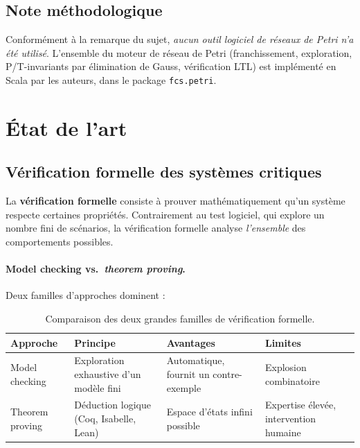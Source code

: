 \documentclass[11pt,a4paper]{article}
\newcommand{\code}[1]{\texttt{#1}}
\begin{document}
\subsection{Note méthodologique}

Conformément à la remarque du sujet, \emph{aucun outil logiciel de réseaux de
Petri n'a été utilisé}. L'ensemble du moteur de réseau de Petri (franchissement,
exploration, P/T-invariants par élimination de Gauss, vérification LTL) est
implémenté en Scala par les auteurs, dans le package \code{fcs.petri}.

\section{État de l'art}

\subsection{Vérification formelle des systèmes critiques}

La \textbf{vérification formelle} consiste à prouver mathématiquement qu'un
système respecte certaines propriétés. Contrairement au test logiciel, qui
explore un nombre fini de scénarios, la vérification formelle analyse
\emph{l'ensemble} des comportements possibles.

\paragraph{Model checking vs.\ \textit{theorem proving}.}
Deux familles d'approches dominent :

\begin{table}[H]
\centering\small
\begin{tabularx}{\linewidth}{l X X X}
\toprule
\rowcolor{tableheader}\textbf{Approche} & \textbf{Principe} & \textbf{Avantages} & \textbf{Limites} \\
\midrule
Model checking
& Exploration exhaustive d'un modèle fini
& Automatique, fournit un contre-exemple
& Explosion combinatoire \\
\addlinespace
Theorem proving
& Déduction logique (Coq, Isabelle, Lean)
& Espace d'états infini possible
& Expertise élevée, intervention humaine \\
\bottomrule
\end{tabularx}
\caption{Comparaison des deux grandes familles de vérification formelle.}
\end{table}
\end{document}
